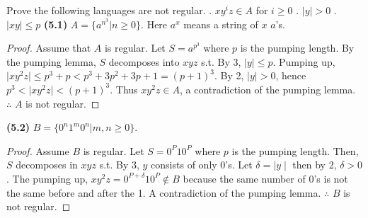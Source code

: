 \documentclass[11pt]{article}
\begin{document}
Prove the following languages are not regular.
\newline
{}. $xy^{i}z \in A$ for $i \geq 0$
. $\mid y \mid > 0$
. $\mid xy \mid \leq p$
\newline
\newline
\noindent
\textbf{(5.1)} $A=\{a^{n^3}|n\geq 0\}$. Here $a^x$ means a string of $x$ $a$'s.
\newline
\begin{proof}
Assume that $A$ is regular. Let $S = a^{p^{3}}$ where $p$ is the pumping length. By the pumping lemma, $S$ decomposes into $xyz$ s.t.
\newline
\newline
\noindent
By 3, $\mid y \mid \leq p$.
\newline
Pumping up, $\mid xy^{2}z \mid \leq p^{3} + p < p^{3} + 3p^{2} +3p +1 = (p+1)^{3}$.
\newline
By 2, $\mid y \mid > 0$, hence $p^{3} < \mid xy^{2}z \mid < (p+1)^{3}$. Thus $xy^{2}z \in A$, a contradiction of the pumping lemma.
\newline
\noindent
$\therefore$ $A$ is not regular.
\end{proof}

\noindent
\textbf{(5.2)} $B=\{0^n1^m0^n|m,n\geq 0\}$.
\newline
\begin{proof}
Assume $B$ is regular. Let $S = 0^{P}10^{P}$ where $p$ is the pumping length. Then, $S$ decomposes in $xyz$ s.t.
\newline
\newline
By 3, $y$ consists of only 0's.
\newline
Let $\delta = \mid y \mid$ then by 2, $\delta > 0$.
\newline
The pumping up, $xy^{2}z = 0^{P+\delta}10^{P} \notin B$ because the same number of 0's is not the same before and after the 1.
\newline
A contradiction of the pumping lemma.
\newline
$\therefore$ $B$ is not regular.
\end{proof}
\end{document}
